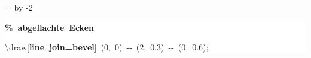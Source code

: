 \begingroup
\ttfamily
{}
=\textwidth
\advance{} by -2\fboxsep
\noindent
\colorbox{background}
{%
\parbox{\dimen255}
{%
\rule[-0.5ex]{0pt}{2.5ex}\hspace*{0.0em}\textcolor{G}{\textbf{\%~abgeflachte~Ecken}}\\
\rule[-0.5ex]{0pt}{2.5ex}\hspace*{0.0em}\textbackslash{}draw[\textcolor{R}{\textbf{line~join=bevel}}]~(0,~0)~{-}{-}~(2,~0.3)~{-}{-}~(0,~0.6);}%
}%
\endgroup
